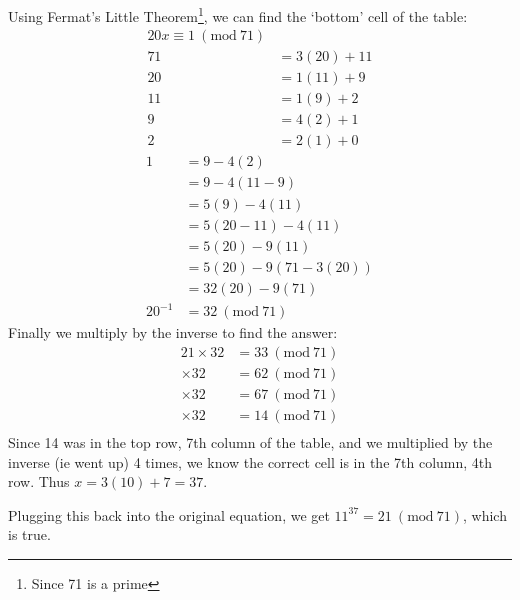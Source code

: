 \documentclass{article}
\newcommand{\Mod}[1]{\ (\mathrm{mod}\ #1)}
\begin{document}
\begin{enumerate}[label=(\alph*)]
          Using Fermat's Little Theorem\footnote{Since 71 is a prime}, we can find the `bottom' cell of the table:
          \begin{align*}
              20x \equiv 1 \Mod{71} &              \\
              71                    & = 3(20) + 11 \\
              20                    & = 1(11) + 9  \\
              11                    & = 1(9) + 2   \\
              9                     & = 4(2) + 1   \\
              2                     & = 2(1) + 0
          \end{align*}
          \begin{align*}
              1       & = 9 - 4(2)              \\
                      & = 9 - 4(11 - 9)         \\
                      & = 5(9) - 4(11)          \\
                      & = 5(20 - 11) - 4(11)    \\
                      & = 5(20) - 9(11)         \\
                      & = 5(20) - 9(71 - 3(20)) \\
                      & = 32(20) - 9(71)        \\
              20^{-1} & = 32 \Mod{71}
          \end{align*}
          Finally we multiply by the inverse to find the answer:
          \begin{align*}
              21 \times 32 & = 33 \Mod{71} \\
              \times 32    & = 62 \Mod{71} \\
              \times 32    & = 67 \Mod{71} \\
              \times 32    & = 14 \Mod{71} \\
          \end{align*}
          Since 14 was in the top row, 7th column of the table, and we multiplied by the inverse (ie went up)
          4 times, we know the correct cell is in the 7th column, 4th row. Thus
          \(x = 3(10) + 7 = 37\).

          Plugging this back into the original equation, we get
          \(11^{37} = 21 \Mod{71}\), which is true.
\end{enumerate}

\pagebreak
\end{document}
